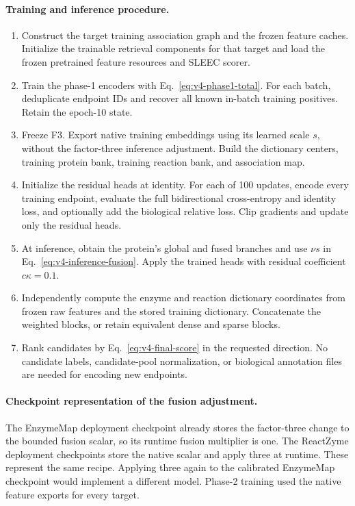 \paragraph{Training and inference procedure.}
\begin{enumerate}[leftmargin=*,itemsep=5pt]
  \item Construct the target training association graph and the frozen feature
  caches. Initialize the trainable retrieval components for that target and
  load the frozen pretrained feature resources and SLEEC scorer.
  \item Train the phase-1 encoders with Eq.~\eqref{eq:v4-phase1-total}. For
  each batch, deduplicate endpoint IDs and recover all known in-batch training
  positives. Retain the epoch-10 state.
  \item Freeze F3. Export native training embeddings using its learned scale
  $s$, without the factor-three inference adjustment. Build the dictionary
  centers, training protein bank, training reaction bank, and association map.
  \item Initialize the residual heads at identity. For each of 100 updates,
  encode every training endpoint, evaluate the full bidirectional
  cross-entropy and identity loss, and optionally add the biological relative
  loss. Clip gradients and update only the residual heads.
  \item At inference, obtain the protein's global and fused branches and use
  $\nu s$ in Eq.~\eqref{eq:v4-inference-fusion}. Apply the trained heads with
  residual coefficient $c\kappa=0.1$.
  \item Independently compute the enzyme and reaction dictionary coordinates
  from frozen raw features and the stored training dictionary. Concatenate
  the weighted blocks, or retain equivalent dense and sparse blocks.
  \item Rank candidates by Eq.~\eqref{eq:v4-final-score} in the requested
  direction. No candidate labels, candidate-pool normalization, or biological
  annotation files are needed for encoding new endpoints.
\end{enumerate}

\paragraph{Checkpoint representation of the fusion adjustment.}
The EnzymeMap deployment checkpoint already stores the factor-three change
to the bounded fusion scalar, so its runtime fusion multiplier is one.
The ReactZyme deployment checkpoints store the native scalar and apply three
at runtime. These represent the same recipe. Applying three again to the
calibrated EnzymeMap checkpoint would implement a different model. Phase-2
training used the native feature exports for every target.

